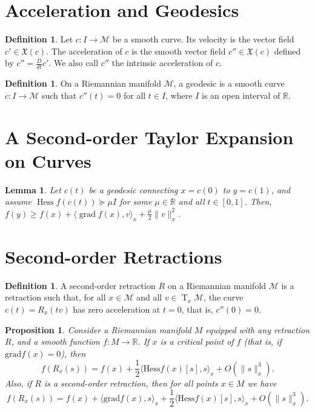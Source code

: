 \documentclass{article}
\theoremstyle{plain}
\newtheorem{proposition}[theorem]{Proposition}
\newtheorem{lemma}[theorem]{Lemma}
\theoremstyle{definition}
\newtheorem{definition}[theorem]{Definition}
\newcommand{\Tang}[2]{\operatorname{T}_{#1}{\mathcal{#2}}}
\def\bbR{\mathbb{R}}
\def\calM{\mathcal{M}}
\begin{document}
\section{Acceleration and Geodesics}
\begin{definition}
Let $c : I \to \calM$ be a smooth curve. 
Its velocity is the vector field $c' \in \mathfrak{X}(c)$. 
The acceleration of $c$ is the smooth vector field $c'' \in \mathfrak{X}(c)$ defined by $c'' = \frac{D}{dt} c'$. 
We also call $c''$ the intrinsic acceleration of $c$. 
\end{definition}

\begin{definition}
On a Riemannian manifold $\calM$, a geodesic is a smooth curve
$c : I \to \calM$ such that $c''(t) = 0$ for all $t \in I$, where $I$ is an open interval of $\bbR$.
\end{definition}


\section{A Second-order Taylor Expansion on Curves}

\begin{lemma}
Let $c(t)$ be a geodesic connecting $x = c(0)$ to $y = c(1)$, and
assume $\operatorname{Hess}f(c(t)) \succeq \mu I$ for some $\mu\in \bbR$ and all $t\in [0,1]$. Then, $f(y) \ge f(x) + \langle \operatorname{grad}f(x), v\rangle_x + \frac{\mu}{2} \|v\|_x^2$.
\end{lemma}

\section{Second-order Retractions}
\begin{definition}
A second-order retraction $R$ on a Riemannian manifold $\calM$ is
a retraction such that, for all $x\in \calM$ and all $v \in \Tang{x}{M}$, the curve $c(t) = R_x(tv)$ has zero acceleration at $t = 0$, that is, $c''(0) = 0$.
\end{definition}

\begin{proposition}
Consider a Riemannian manifold $ M $ equipped with any re\-traction $ R $, and a smooth function $ f: M \to \mathbb{R} $. If $ x $ is a critical point of $ f $ (that is, if $ \mathrm{grad}f(x) = 0 $), then
$$f(R_x(s)) = f(x) + \frac{1}{2} \langle \mathrm{Hess}f(x)[s], s \rangle_x + O(\|s\|_x^3).$$
Also, if $ R $ is a second-order retraction, then for all points $ x \in M $ we have
$$f(R_x(s)) = f(x) + \langle \mathrm{grad}f(x), s \rangle_x + \frac{1}{2} \langle \mathrm{Hess}f(x)[s], s \rangle_x + O(\|s\|_x^3).$$
\end{proposition}
\end{document}
